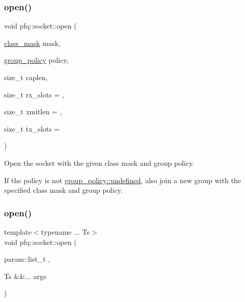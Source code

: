 \subsubsection{\texorpdfstring{open()}{open()}\hspace{0.1cm}{\footnotesize\ttfamily [2/3]}}
{\footnotesize\ttfamily void pfq\+::socket\+::open (\begin{DoxyParamCaption}\item[{\hyperlink{namespacepfq_a96af1f5ed530eff563eb917516758fbb}{class\+\_\+mask}}]{mask,  }\item[{\hyperlink{namespacepfq_ac41249c8510558905b01fa4d866a38d7}{group\+\_\+policy}}]{policy,  }\item[{size\+\_\+t}]{caplen,  }\item[{size\+\_\+t}]{rx\+\_\+slots = {},  }\item[{size\+\_\+t}]{xmitlen = {},  }\item[{size\+\_\+t}]{tx\+\_\+slots = {} }\end{DoxyParamCaption})\hspace{0.3cm}{\ttfamily [inline]}}



Open the socket with the given class mask and group policy. 

If the policy is not \hyperlink{namespacepfq_ac41249c8510558905b01fa4d866a38d7a5e543256c480ac577d30f76f9120eb74}{group\+\_\+policy\+::undefined}, also join a new group with the specified class mask and group policy. \mbox{\label{classpfq_1_1socket_a33c3e305c62f5a9f8a0ef74f69097ecf}} 
\subsubsection{\texorpdfstring{open()}{open()}\hspace{0.1cm}{\footnotesize\ttfamily [3/3]}}
{\footnotesize\ttfamily template$<$typename ... Ts$>$ \\
void pfq\+::socket\+::open (\begin{DoxyParamCaption}\item[{param\+::list\+\_\+t}]{,  }\item[{Ts \&\&...}]{args }\end{DoxyParamCaption})\hspace{0.3cm}{\ttfamily [inline]}}



